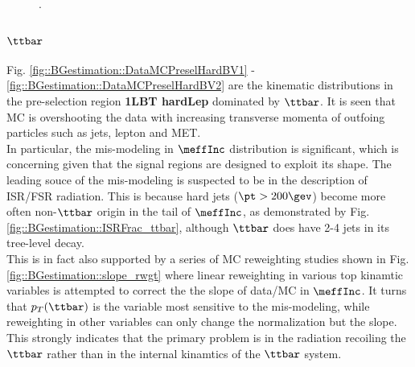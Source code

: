\clearpage


%
\clearpage


\begin{figure}[h]
  \centering
    \caption{ .  \label{fig::BGestimation::VRZb} }
\end{figure}


\subsubsection{$\ttbar$}
Fig. \ref{fig::BGestimation::DataMCPreselHardBV1} - \ref{fig::BGestimation::DataMCPreselHardBV2} are the kinematic distributions in the pre-selection region \textbf{1LBT hardLep} dominated by $\ttbar$.
It is seen that MC is overshooting the data with increasing transverse momenta of outfoing particles such as jets, lepton and MET. \\


In particular, the mis-modeling in $\meffInc$ distribution is significant, which is concerning given that the signal regions are designed to exploit its shape. The leading souce of the mis-modeling is suspected to be in the description of ISR/FSR radiation. This is because hard jets ($\pt>200 \gev$) become more often non-$\ttbar$ origin in the tail of $\meffInc$, as demonstrated by Fig. \ref{fig::BGestimation::ISRFrac_ttbar}, although $\ttbar$ does have 2-4 jets in its tree-level decay. \\
This is in fact also supported by a series of MC reweighting studies shown in Fig. \ref{fig::BGestimation::slope_rwgt}  where linear reweighting in various top kinamtic variables is attempted to correct the the slope of data/MC in $\meffInc$. It turns that $p_{T}(\ttbar)$ is the variable most sensitive to the mis-modeling, while reweighting in other variables can only change the normalization but the slope. This strongly indicates that the primary problem is in the radiation recoiling the $\ttbar$ rather than in the internal kinamtics of the $\ttbar$ system. \\


